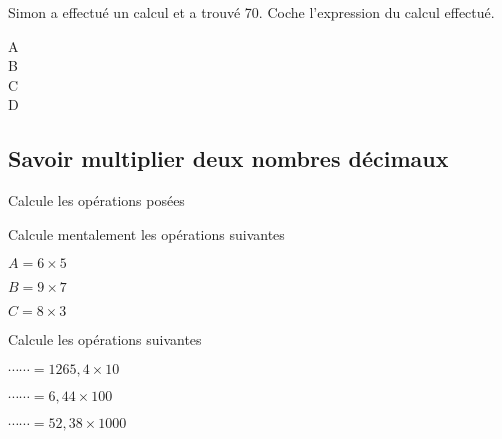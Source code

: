 Simon a effectué un calcul et a trouvé 70. Coche l'expression du calcul effectué.

\begin{description}
\item[A] 
\item[B] 
\item[C]  
\item[D]   

\end{description}



\subsection{Savoir multiplier deux nombres décimaux}




Calcule les opérations posées


\begin{minipage}{0.48\linewidth}
\newcommand\hole[1]{\texttt{\_}}
\opmul[decimalsepsymbol={,},voperator=bottom,intermediarystyle=\hole,
resultstyle=\hole,
resultstyle.d=\white]{5.4}{2.3}
\end{minipage}
\begin{minipage}{0.48\linewidth}

\newcommand\hole[1]{\texttt{\_}}
\opmul[decimalsepsymbol={,},voperator=bottom,intermediarystyle=\hole,
resultstyle=\hole,
resultstyle.d=\white]{35.7}{2.46}
\end{minipage}




Calcule mentalement les opérations suivantes

\begin{description}
\item $A = 6 \times 5$
\item $B = 9 \times 7$
\item $C = 8 \times 3$
\end{description}


Calcule les opérations suivantes

\begin{description}
\item $\cdots \cdots = 1265,4 \times 10 $
\item $\cdots \cdots = 6,44 \times 100 $
\item $\cdots \cdots =  52,38 \times 1000 $
\end{description}



